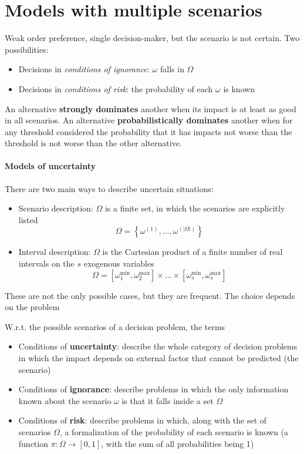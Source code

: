 \section{Models with multiple scenarios}

Weak order preference, single decision-maker, but the scenario is not certain. Two possibilities: 
\begin{itemize}
	\item Decisions in \textit{conditions of ignorance}: $\omega$ falls in $\Omega$
	
	\item Decisions in \textit{conditions of risk}: the probability of each $\omega$ is known
\end{itemize}

An alternative \textbf{strongly dominates} another when its impact is at least as good in all scenarios. An alternative \textbf{probabilistically dominates} another when for any threshold considered the probability that it has impacts not worse than the threshold is not worse than the other alternative.

\paragraph{Models of uncertainty} There are two main ways to describe uncertain situations: 
\begin{itemize}
	\item Scenario description: $\Omega$ is a finite set, in which the scenarios are explicitly listed
	$$\Omega = \left\{\omega^{(1)}, \dots, \omega^{(|\Omega|)}\right\} $$
	
	\item Interval description: $\Omega$ is the Cartesian product of a finite number of real intervals on the $s$ exogenous variables 
	$$ \Omega = [\omega_1^{\min}, \omega_2^{\max}] \times  \dots  \times [\omega_s^{\min}, \omega_s^{\max}] $$
\end{itemize}

These are not the only possible cases, but they are frequent. The choice depends on the problem

W.r.t. the possible scenarios of a decision problem, the terms
\begin{itemize}
	\item Conditions of \textbf{uncertainty}: describe the whole category of decision problems in which the impact depends on external factor that cannot be predicted (the scenario)
	
	\item Conditions of \textbf{ignorance}: describe problems in which the only information known about the scenario $\omega$ is that it falls inside a set $\Omega$
	
	\item Conditions of \textbf{risk}: describe problems in which, along with the set of scenarios $\Omega$, a formalization of the probability of each scenario is known (a function $\pi: \Omega \rightarrow [0,1]$, with the sum of all probabilities being 1)
\end{itemize}

